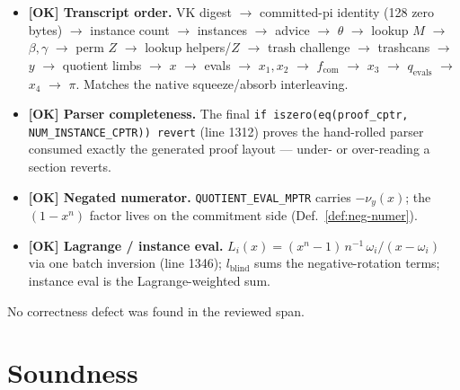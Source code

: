 \begin{itemize}
  \item \textcolor{tracegreen}{\textbf{[OK] Transcript order.}} VK
        digest $\to$ committed-pi identity (128 zero bytes) $\to$
        instance count $\to$ instances $\to$ advice $\to$ $\theta$ $\to$
        lookup $M$ $\to$ $\beta,\gamma$ $\to$ perm $Z$ $\to$ lookup
        helpers/$Z$ $\to$ trash challenge $\to$ trashcans $\to$ $y$ $\to$
        quotient limbs $\to$ $x$ $\to$
        evals $\to$ $x_1,x_2$ $\to$ $f_\text{com}$ $\to$ $x_3$ $\to$
        $q_\text{evals}$ $\to$ $x_4$ $\to$ $\pi$. Matches the native
        squeeze/absorb interleaving.
  \item \textcolor{tracegreen}{\textbf{[OK] Parser completeness.}} The
        final \texttt{if iszero(eq(proof\_\allowbreak{}cptr, NUM\_\allowbreak{}INSTANCE\_\allowbreak{}CPTR))
        revert} (line 1312) proves the hand-rolled parser consumed
        exactly the generated proof layout --- under- or over-reading a
        section reverts.
  \item \textcolor{tracegreen}{\textbf{[OK] Negated numerator.}}
        \texttt{QUOTIENT\_\allowbreak{}EVAL\_\allowbreak{}MPTR} carries $-\nu_y(x)$; the
        $(1-x^n)$ factor lives on the commitment side
        (Def.~\ref{def:neg-numer}).
  \item \textcolor{tracegreen}{\textbf{[OK] Lagrange / instance eval.}}
        $L_i(x)=(x^n-1)\,n^{-1}\,\omega_i/(x-\omega_i)$ via one batch
        inversion (line 1346); $l_\text{blind}$ sums the negative-rotation
        terms; instance eval is the Lagrange-weighted sum.
\end{itemize}

No correctness defect was found in the reviewed span.

\section{Soundness}
\label{sec:pr-sound}

